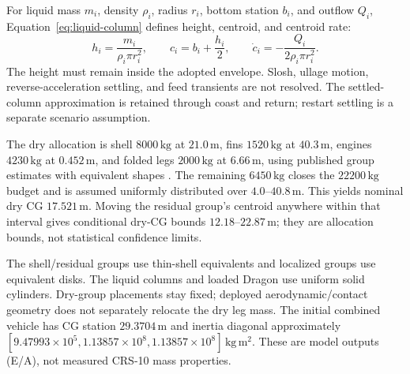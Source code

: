 For liquid mass $m_i$, density $\rho_i$, radius $r_i$, bottom station $b_i$, and outflow $Q_i$, Equation~\eqref{eq:liquid-column} defines height, centroid, and centroid rate:
\begin{equation}
 h_i=\frac{m_i}{\rho_i\pi r_i^2},\qquad
 c_i=b_i+\frac{h_i}{2},\qquad
 \dot c_i=-\frac{Q_i}{2\rho_i\pi r_i^2}.
\label{eq:liquid-column}
\end{equation}
The height must remain inside the adopted envelope. Slosh, ullage motion, reverse-acceleration settling, and feed transients are not resolved. The settled-column approximation is retained through coast and return; restart settling is a separate scenario assumption.

The dry allocation is shell $8000\,\mathrm{kg}$ at $21.0\,\mathrm{m}$, fins $1520\,\mathrm{kg}$ at $40.3\,\mathrm{m}$, engines $4230\,\mathrm{kg}$ at $0.452\,\mathrm{m}$, and folded legs $2000\,\mathrm{kg}$ at $6.66\,\mathrm{m}$, using published group estimates with equivalent shapes \cite[Table 2]{bykerk2023}. The remaining $6450\,\mathrm{kg}$ closes the $22200\,\mathrm{kg}$ budget and is assumed uniformly distributed over $4.0$--$40.8\,\mathrm{m}$. This yields nominal dry CG $17.521\,\mathrm{m}$. Moving the residual group's centroid anywhere within that interval gives conditional dry-CG bounds $12.18$--$22.87\,\mathrm{m}$; they are allocation bounds, not statistical confidence limits.

The shell/residual groups use thin-shell equivalents and localized groups use equivalent disks. The liquid columns and loaded Dragon use uniform solid cylinders. Dry-group placements stay fixed; deployed aerodynamic/contact geometry does not separately relocate the dry leg mass. The initial combined vehicle has CG station $29.3704\,\mathrm{m}$ and inertia diagonal approximately $[9.47993\times10^5,1.13857\times10^8,1.13857\times10^8]\,\mathrm{kg\,m^2}$. These are model outputs (E/A), not measured CRS-10 mass properties.

